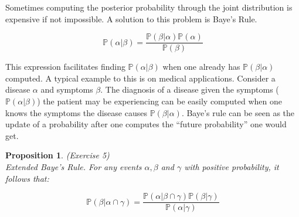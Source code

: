 \documentclass{amsart}
\theoremstyle{plain}
\newtheorem{proposition}{Proposition}
\newcommand{\pr}{\mathbb{P}}
\begin{document}
Sometimes computing the posterior probability through the joint distribution is expensive if not
impossible. A solution to this problem is Baye's Rule.

\begin{equation*}
  \pr(\alpha|\beta)=\frac{\pr(\beta|\alpha)\pr(\alpha)}{\pr(\beta)}
\end{equation*}

This expression facilitates finding $\pr(\alpha|\beta)$ when one already has $\pr(\beta|\alpha)$
computed. A typical example to this is on medical applications. Consider a disease $\alpha$ and
symptoms $\beta$. The diagnosis of a disease given the symptoms ($\pr(\alpha|\beta)$) the patient
may be experiencing can be easily computed when one knows the symptoms the disease causes
$\pr(\beta|\alpha)$. Baye's rule can be seen as the update of a probability after one computes the
``future probability'' one would get.

\begin{proposition} (Exercise 5)\\
  Extended Baye's Rule. For any events $\alpha,\beta$ and $\gamma$ with positive probability, it
  follows that:

  \begin{equation*}
    \pr(\beta|\alpha\cap\gamma)=\frac{\pr(\alpha|\beta\cap\gamma)\pr(\beta|\gamma)}{\pr(\alpha|
    \gamma)}
  \end{equation*}
\end{proposition}
\end{document}
